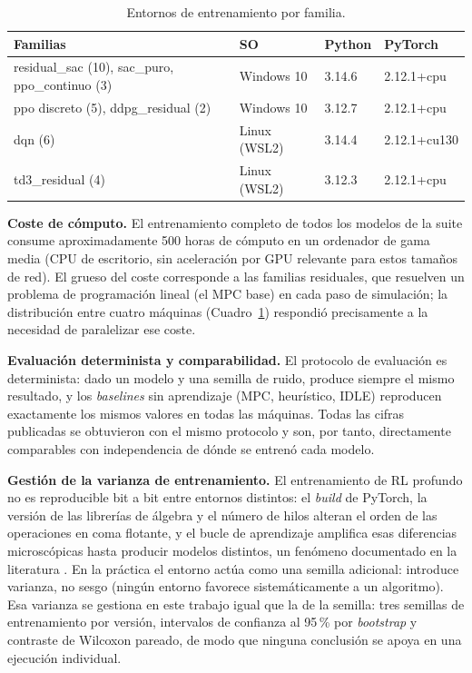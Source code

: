 \documentclass[12pt, a4paper, twoside]{report}
\begin{document}
\begin{table}[H]
\centering\small
\caption{Entornos de entrenamiento por familia.}
\label{tab:entornos}
\begin{tabular}{llll}
\toprule
\textbf{Familias} & \textbf{SO} & \textbf{Python} & \textbf{PyTorch} \\
\midrule
residual\_sac (10), sac\_puro, ppo\_continuo (3) & Windows 10 & 3.14.6 & 2.12.1+cpu \\
ppo discreto (5), ddpg\_residual (2) & Windows 10 & 3.12.7 & 2.12.1+cpu \\
dqn (6) & Linux (WSL2) & 3.14.4 & 2.12.1+cu130 \\
td3\_residual (4) & Linux (WSL2) & 3.12.3 & 2.12.1+cpu \\
\bottomrule
\end{tabular}
\end{table}

\textbf{Coste de cómputo.} El entrenamiento completo de todos los modelos de
la suite consume aproximadamente 500 horas de cómputo en un ordenador de gama
media (CPU de escritorio, sin aceleración por GPU relevante para estos tamaños
de red). El grueso del coste corresponde a las familias residuales, que
resuelven un problema de programación lineal (el MPC base) en cada paso de
simulación; la distribución entre cuatro máquinas (Cuadro~\ref{tab:entornos})
respondió precisamente a la necesidad de paralelizar ese coste.

\textbf{Evaluación determinista y comparabilidad.} El protocolo de evaluación
es determinista: dado un modelo y una semilla de ruido, produce siempre el
mismo resultado, y los \textit{baselines} sin aprendizaje (MPC, heurístico,
IDLE) reproducen exactamente los mismos valores en todas las máquinas. Todas
las cifras publicadas se obtuvieron con el mismo protocolo y son, por tanto,
directamente comparables con independencia de dónde se entrenó cada modelo.

\textbf{Gestión de la varianza de entrenamiento.} El entrenamiento de RL
profundo no es reproducible bit a bit entre entornos distintos: el
\textit{build} de PyTorch, la versión de las librerías de álgebra y el número
de hilos alteran el orden de las operaciones en coma flotante, y el bucle de
aprendizaje amplifica esas diferencias microscópicas hasta producir modelos
distintos, un fenómeno documentado en la literatura \citep{Henderson2017}. En
la práctica el entorno actúa como una semilla adicional: introduce varianza,
no sesgo (ningún entorno favorece sistemáticamente a un algoritmo). Esa
varianza se gestiona en este trabajo igual que la de la semilla: tres semillas
de entrenamiento por versión, intervalos de confianza al 95\,\% por
\textit{bootstrap} y contraste de Wilcoxon pareado, de modo que ninguna
conclusión se apoya en una ejecución individual.
\end{document}
